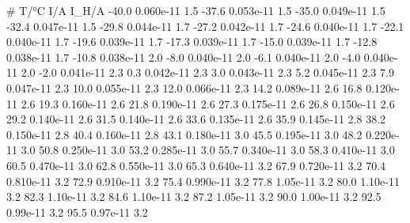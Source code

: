 # T/°C 	I/A 	I_H/A
-40.0 	0.060e-11 	1.5
-37.6 	0.053e-11 	1.5
-35.0 	0.049e-11 	1.5
-32.4 	0.047e-11 	1.5
-29.8 	0.044e-11 	1.7
-27.2 	0.042e-11 	1.7
-24.6 	0.040e-11 	1.7
-22.1 	0.040e-11 	1.7
-19.6 	0.039e-11 	1.7
-17.3 	0.039e-11 	1.7
-15.0 	0.039e-11 	1.7
-12.8 	0.038e-11 	1.7
-10.8 	0.038e-11 	2.0
-8.0 	0.040e-11 	2.0
-6.1 	0.040e-11 	2.0
-4.0 	0.040e-11 	2.0
-2.0 	0.041e-11 	2.3
0.3 	0.042e-11 	2.3
3.0 	0.043e-11 	2.3
5.2 	0.045e-11 	2.3
7.9 	0.047e-11 	2.3
10.0 	0.055e-11 	2.3
12.0 	0.066e-11 	2.3
14.2 	0.089e-11 	2.6
16.8 	0.120e-11 	2.6
19.3 	0.160e-11 	2.6
21.8 	0.190e-11 	2.6
27.3 	0.175e-11 	2.6
26.8 	0.150e-11 	2.6
29.2 	0.140e-11 	2.6
31.5 	0.140e-11 	2.6
33.6 	0.135e-11 	2.6
35.9 	0.145e-11 	2.8
38.2 	0.150e-11 	2.8
40.4 	0.160e-11 	2.8
43.1 	0.180e-11 	3.0
45.5 	0.195e-11 	3.0
48.2 	0.220e-11 	3.0
50.8 	0.250e-11 	3.0
53.2 	0.285e-11 	3.0
55.7 	0.340e-11 	3.0
58.3 	0.410e-11 	3.0
60.5 	0.470e-11 	3.0
62.8 	0.550e-11 	3.0
65.3 	0.640e-11 	3.2
67.9 	0.720e-11 	3.2
70.4 	0.810e-11 	3.2
72.9 	0.910e-11 	3.2
75.4 	0.990e-11 	3.2
77.8 	1.05e-11 	3.2
80.0 	1.10e-11 	3.2
82.3 	1.10e-11 	3.2
84.6 	1.10e-11 	3.2
87.2 	1.05e-11 	3.2
90.0 	1.00e-11 	3.2
92.5 	0.99e-11 	3.2
95.5 	0.97e-11 	3.2
